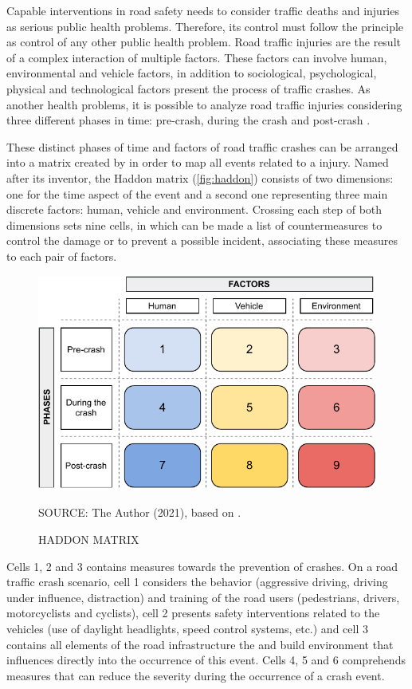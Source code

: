 Capable interventions in road safety needs to consider traffic deaths and injuries as serious public health problems. Therefore, its control must follow the principle as control of any other public health problem. Road traffic injuries are the result of a complex interaction of multiple factors. These factors can involve human, environmental and vehicle factors, in addition to sociological, psychological, physical and technological factors present the process of traffic crashes. As another health problems, it is possible to analyze road traffic injuries considering three different phases in time: pre-crash, during the crash and post-crash \cite{Mohan2016}.

These distinct phases of time and factors of road traffic crashes can be arranged into a matrix created by \textcite{Haddon1980} in order to map all events related to a injury. Named after its inventor, the Haddon matrix (\autoref{fig:haddon}) consists of two dimensions: one for the time aspect of the event and a second one representing three main discrete factors: human, vehicle and environment. Crossing each step of both dimensions sets nine cells, in which can be made a list of countermeasures to control the damage or to prevent a possible incident, associating these measures to each pair of factors. 

\begin{figure}[!htbp]
    \centering\footnotesize
    \captionsetup{font=footnotesize}
    \caption{HADDON MATRIX}
    \includegraphics{fig/haddon.pdf}
    \label{fig:haddon}
    \par SOURCE: The Author (2021), based on \textcite{Haddon1980}.
\end{figure} 

Cells 1, 2 and 3 contains measures towards the prevention of crashes. On a road traffic crash scenario, cell 1 considers the behavior (aggressive driving, driving under influence, distraction) and training of the road users (pedestrians, drivers, motorcyclists and cyclists), cell 2 presents safety interventions related to the vehicles (use of daylight headlights, speed control systems, etc.) and cell 3 contains all elements of the road infrastructure the and build environment that influences directly into the occurrence of this event. Cells 4, 5 and 6 comprehends measures that can reduce the severity during the occurrence of a crash event.

